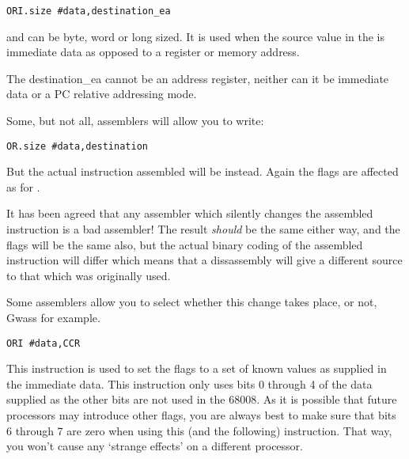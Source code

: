 \begin{lstlisting}[firstnumber=1,]
          ORI.size #data,destination_ea
\end{lstlisting}

and can be byte, word or long sized. It is used when the source
    value in the  is immediate data as opposed to a register or memory
    address. 
    
\begin{warning}
The destination\_ea cannot be an address register, neither can it be immediate data or a PC relative addressing mode. 
\end{warning}   
    
Some, but not all, assemblers will allow you to write:

\begin{lstlisting}[firstnumber=1,]
          OR.size #data,destination
\end{lstlisting}

But the actual instruction assembled will be  instead. Again the
    flags are affected as for .
    
\begin{note}
It has been agreed that any assembler which silently changes the assembled instruction is a bad assembler! The result \emph{should} be the same either way, and the flags will be the same also, but the actual binary coding of the assembled instruction will differ which means that a dissassembly will give a different source to that which was originally used.

Some assemblers allow you to select whether this change takes place, or not, Gwass for example.
\end{note}    

\begin{lstlisting}[firstnumber=1,]
          ORI #data,CCR 
\end{lstlisting}

This instruction is used to set the flags to a set of known values
    as supplied in the immediate data. This instruction only uses bits 0
    through 4 of the data supplied as the other bits are not used in the
    68008. As it is possible that future processors may introduce other flags,
    you are always best to make sure that bits 6 through 7 are zero when using
    this (and the following) instruction. That way, you won't cause any
    `strange effects' on a different processor.


